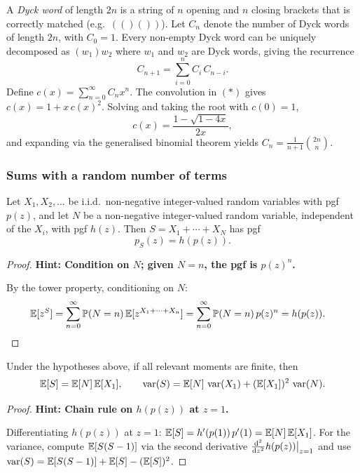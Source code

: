 \documentclass[a4paper]{article}
\begin{document}
\begin{eg}
  A \emph{Dyck word} of length $2n$ is a string of $n$ opening and $n$ closing brackets that is correctly matched (e.g.\ $(()())$). Let $C_n$ denote the number of Dyck words of length $2n$, with $C_0 = 1$. Every non-empty Dyck word can be uniquely decomposed as $(w_1)w_2$ where $w_1$ and $w_2$ are Dyck words, giving the recurrence
  \[
    C_{n + 1} = \sum_{i = 0}^n C_i\, C_{n - i}.\tag{$*$}
  \]
  Define $c(x) = \sum_{n=0}^\infty C_n x^n$. The convolution in $(*)$ gives $c(x) = 1 + x\,c(x)^2$. Solving and taking the root with $c(0) = 1$,
  \[
    c(x) = \frac{1 - \sqrt{1 - 4x}}{2x},
  \]
  and expanding via the generalised binomial theorem yields $C_n = \frac{1}{n+1}\binom{2n}{n}$.
\end{eg}

\subsubsection*{Sums with a random number of terms}

\begin{thm}
  Let $X_1, X_2, \dotsc$ be i.i.d.\ non-negative integer-valued random variables with pgf $p(z)$, and let $N$ be a non-negative integer-valued random variable, independent of the $X_i$, with pgf $h(z)$. Then $S = X_1 + \cdots + X_N$ has pgf
  \[
    p_S(z) = h(p(z)).
  \]
\end{thm}

\begin{proof}
  \textbf{Hint: Condition on $N$; given $N = n$, the pgf is $p(z)^n$.}

  By the tower property, conditioning on $N$:
  \begin{align*}
    \mathbb{E}[z^{S}] &= \sum_{n = 0}^\infty \mathbb{P}(N = n)\, \mathbb{E}[z^{X_1 + \cdots + X_n}] = \sum_{n = 0}^\infty \mathbb{P}(N = n)\, p(z)^n = h(p(z)).\qedhere
  \end{align*}
\end{proof}

\begin{cor}
  Under the hypotheses above, if all relevant moments are finite, then
  \[
    \mathbb{E}[S] = \mathbb{E}[N]\,\mathbb{E}[X_1], \qquad \operatorname{var}(S) = \mathbb{E}[N]\,\operatorname{var}(X_1) + (\mathbb{E}[X_1])^2\,\operatorname{var}(N).
  \]
\end{cor}

\begin{proof}
  \textbf{Hint: Chain rule on $h(p(z))$ at $z = 1$.}

  Differentiating $h(p(z))$ at $z = 1$: $\mathbb{E}[S] = h'(p(1))\,p'(1) = \mathbb{E}[N]\,\mathbb{E}[X_1]$. For the variance, compute $\mathbb{E}[S(S-1)]$ via the second derivative $\frac{\mathrm{d}^2}{\mathrm{d} z^2}h(p(z))\big|_{z=1}$ and use $\operatorname{var}(S) = \mathbb{E}[S(S-1)] + \mathbb{E}[S] - (\mathbb{E}[S])^2$.
\end{proof}
\end{document}
